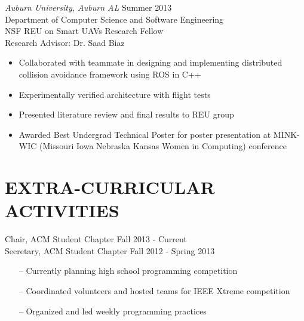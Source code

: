 \documentclass[line,margin]{res}
\begin{document}
\begin{resume}
		{\sl Auburn University, Auburn AL}  \hfill  Summer 2013\\
		Department of Computer Science and Software Engineering  \\
		NSF REU on Smart UAVs Research Fellow \\
		Research Advisor: Dr. Saad Biaz
                 \begin{itemize}[leftmargin=5mm]  \itemsep -2pt %
		 \item Collaborated with teammate in designing and implementing distributed collision avoidance framework using ROS in C++ 
		 \item Experimentally verified architecture with flight tests  
		 \item Presented literature review and final results to REU group
		 \item Awarded Best Undergrad Technical Poster for poster presentation at MINK-WIC (Missouri Iowa Nebraska Kansas Women in Computing) conference
                 \end{itemize} 
\section{EXTRA-CURRICULAR \\ ACTIVITIES}             
	
%
%	
%		

		Chair, ACM Student Chapter \hfill Fall 2013 - Current \\
		Secretary, ACM Student Chapter \hfill Fall 2012 - Spring 2013 
		         \begin{itemize} [leftmargin=5mm]  \itemsep -2pt %
                 \item[--] Currently planning high school programming competition 
                 \item[--] Coordinated volunteers and hosted teams for IEEE Xtreme competition 
                 \item[--] Organized and led weekly programming practices
                 \end{itemize} 


\end{resume}
\end{document}
